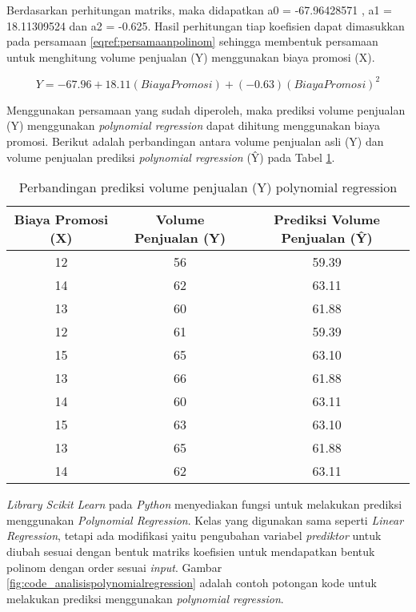 Berdasarkan perhitungan matriks, maka didapatkan a0 = -67.96428571 , a1 = 18.11309524  dan a2 = -0.625. Hasil perhitungan tiap koefisien dapat dimasukkan pada persamaan \ref{eqref:persamaanpolinom} sehingga membentuk persamaan untuk menghitung volume penjualan (Y) menggunakan biaya promosi (X).


\begin{displaymath}
 Y = -67.96 + 18.11(Biaya Promosi) + (-0.63)(Biaya Promosi)^2 
\end{displaymath}


Menggunakan persamaan yang sudah diperoleh, maka prediksi volume penjualan (Y) menggunakan \textit{polynomial regression} dapat dihitung menggunakan biaya promosi. Berikut adalah  perbandingan antara volume penjualan asli (Y) dan volume penjualan prediksi \textit{polynomial regression} (\^{Y}) pada Tabel \ref{tab:perbandinganpolynomialregression}.

\begin{table}[H]
\caption{Perbandingan prediksi volume penjualan (Y) polynomial regression}
\centering
\begin{tabular}{|c|c|c|}
\hline 
Biaya Promosi (X) & Volume Penjualan (Y) & Prediksi Volume Penjualan (\^{Y})  \\ 
\hline 
12 & 56 & 59.39 \\ 
\hline 
14 & 62 & 63.11 \\ 
\hline 
13 & 60 & 61.88 \\ 
\hline 
12 & 61 & 59.39 \\ 
\hline 
15 & 65 & 63.10 \\ 
\hline 
13 & 66 & 61.88 \\ 
\hline 
14 & 60 & 63.11 \\ 
\hline 
15 & 63 & 63.10 \\ 
\hline 
13 & 65 & 61.88 \\ 
\hline 
14 & 62 & 63.11 \\ 
\hline 
\end{tabular} 
\label{tab:perbandinganpolynomialregression}
\end{table}

\textit{Library Scikit Learn} pada \textit{Python} menyediakan fungsi untuk melakukan prediksi menggunakan \textit{Polynomial Regression}. Kelas yang digunakan sama seperti \textit{Linear Regression}, tetapi ada modifikasi yaitu pengubahan variabel \textit{prediktor} untuk diubah sesuai dengan bentuk matriks koefisien untuk mendapatkan bentuk polinom dengan order sesuai \textit{input}. Gambar \ref{fig:code_analisispolynomialregression} adalah contoh potongan kode untuk melakukan prediksi menggunakan \textit{polynomial regression}. 


